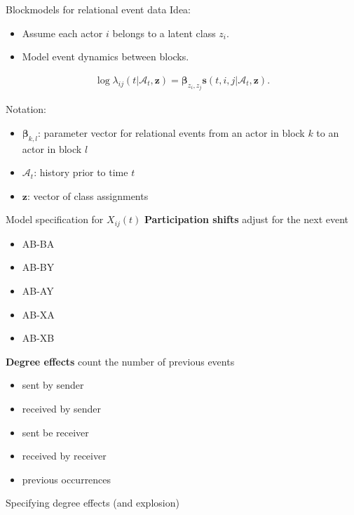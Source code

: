 \documentclass{beamer}
\begin{document}
\begin{frame}{Blockmodels for relational event data}
Idea:
  \begin{itemize}
  \item Assume each actor $i$ belongs to a latent class $z_i$.
  \item Model event dynamics between blocks.
  \end{itemize}

\begin{align}
\log \lambda_{ij}(t | \mathcal{A}_t,\mathbf{z}) = \boldsymbol{\beta}_{z_i,z_j} \mathbf{s}(t,i,j|\mathcal{A}_t,\mathbf{z}).
\end{align}

Notation:
\begin{itemize}
\item $\boldsymbol{\beta}_{k,l}$: parameter vector for relational events from an actor in block $k$ to an actor in block $l$
\item  $\mathcal{A}_t$: history prior to time $t$
\item $\mathbf{z}$: vector of class assignments
\end{itemize}

\end{frame}

\begin{frame}{Model specification for $X_{ij}(t)$}
\textbf{Participation shifts} adjust for the next event
\begin{itemize}
\item AB-BA
\item AB-BY
\item AB-AY
\item AB-XA
\item AB-XB
\end{itemize}

\textbf{Degree effects} count the number of previous events
\begin{itemize}
\item sent by sender
\item received by sender
\item sent be receiver
\item received by receiver
\item previous occurrences
\end{itemize}

\end{frame}

\begin{frame}{Specifying degree effects (and explosion)}

\end{frame}
\end{document}

